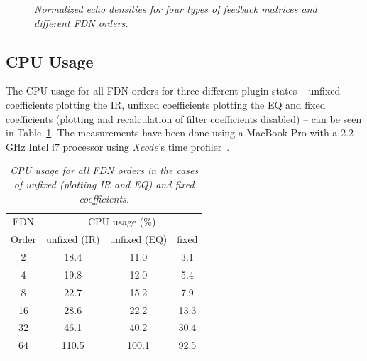 \documentclass[twoside,a4paper]{article}
\begin{document}
\begin{figure}[ht!]
     \hfill
    \caption{\textit{Normalized echo densities for four types of feedback matrices and different FDN orders.}}
    \label{fig:echo}
\end{figure}

\subsection{CPU Usage}
The CPU usage for all FDN orders for three different plugin-states -- unfixed coefficients plotting the IR, unfixed coefficients plotting the EQ and fixed coefficients (plotting and recalculation of filter coefficients disabled) -- can be seen in Table~\ref{tab:CPU}. The measurements have been done using a MacBook Pro with a 2.2\,GHz Intel i7 processor using \textit{Xcode}'s time profiler~\cite{Xcode}.

\begin{table}[h]
    \caption{\textit{CPU usage for all FDN orders in the cases of unfixed (plotting IR and EQ) and fixed coefficients.}}
    \centering
    \begin{tabular}{|c|c|c|c|}
    \hline
      FDN & \multicolumn{3}{|c|}{CPU usage (\%)} \\\cline{2-4}
      Order & unfixed (IR) & unfixed (EQ) & fixed \\
       \hline
       2 & 18.4 & 11.0 & 3.1\\
       4 & 19.8 & 12.0 & 5.4 \\
       8 & 22.7 & 15.2 & 7.9 \\
       16 & 28.6 & 22.2 & 13.3\\
       32 & 46.1 & 40.2 & 30.4\\
       64 & 110.5 & 100.1 & 92.5\\
         \hline
    \end{tabular}
    \label{tab:CPU}
\end{table}
\end{document}
